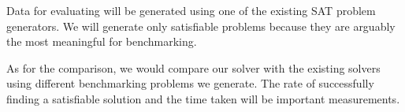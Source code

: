 \documentclass[../proposal.tex]{subfiles}
\begin{document}
Data for evaluating will be generated using one of the existing SAT problem
generators. We will generate only satisfiable problems because they are
arguably the most meaningful for benchmarking.

As for the comparison, we would compare our solver with the existing solvers
using different benchmarking problems we generate. The rate of successfully
finding a satisfiable solution and the time taken will be important
measurements.
\end{document}
